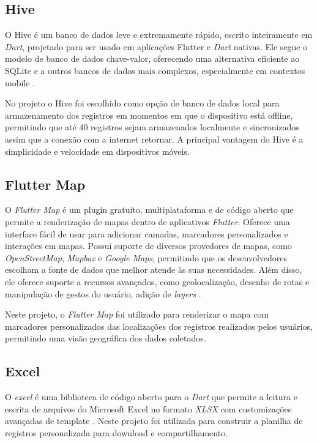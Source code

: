 \subsection{Hive}

O Hive é um banco de dados leve e extremamente rápido, escrito inteiramente 
em \textit{Dart}, projetado para ser usado em aplicações Flutter e 
\textit{Dart} nativas. Ele segue o modelo de banco de dados chave-valor, 
oferecendo uma alternativa eficiente ao SQLite e a outros bancos de dados 
mais complexos, especialmente em contextos mobile \cite{hive2025}.

No projeto o Hive foi escolhido como opção de banco de dados local para armazenamento dos registros em momentos em que o dispositivo está offline, 
permitindo que até 40 registros sejam armazenados localmente e sincronizados assim que a conexão com a internet retornar.
A principal vantagem do Hive é a simplicidade e velocidade em dispositivos móveis.

\subsection{Flutter Map}
O \textit{Flutter Map} é um plugin gratuito, multiplataforma e de código aberto
que permite a renderização de mapas 
dentro de aplicativos \textit{Flutter}. Oferece uma interface fácil de usar 
para adicionar camadas, marcadores personalizados e interações em mapas.
Possui suporte de diversos provedores de mapas, como
\textit{OpenStreetMap}, \textit{Mapbox} e \textit{Google Maps}, 
permitindo que os desenvolvedores 
 escolham a fonte de dados que melhor atende às suas necessidades. 
 Além disso, ele oferece suporte a recursos avançados, como 
 geolocalização, desenho de rotas e manipulação de gestos do 
 usuário, adição de \textit{layers} \cite{flutter_map_doc}.
 
 Neste projeto, o \textit{Flutter Map} foi utilizado para renderizar o mapa
 com marcadores personalizados das localizações dos registros realizados 
 pelos usuários, permitindo uma visão geográfica dos dados coletados.

\subsection{Excel}

O \textit{excel} é uma biblioteca de código aberto para o
\textit{Dart} que permite a leitura e escrita de arquivos do Microsoft Excel 
no formato \textit{XLSX} com customizações avançadas de template \cite{excel_flutter}.
Neste projeto foi utilizada para construir a planilha de registros personalizada para download e compartilhamento.

